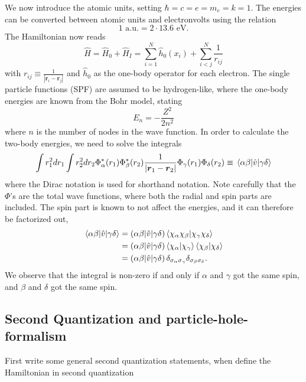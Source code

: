 We now introduce the atomic units, setting $\hbar=c=e=m_e=k=1$. 
The energies can be converted between atomic units and electronvolts using the relation
\begin{equation}
1 \text{ a.u.} = 2\cdot13.6 \text{ eV}.
\end{equation}
The Hamiltonian now reads
\begin{equation}
\hat{H}=\hat{H}_0 + \hat{H}_I=\sum_{i=1}^N\hat{h}_0(x_i)+\sum_{i<j}^N\frac{1}{r_{ij}}
\end{equation}
with $r_{ij}\equiv\frac{1}{|\boldsymbol{r}_i-\boldsymbol{r}_j|}$ and $\hat{h}_0$ as the one-body operator for each electron. The single particle functions (SPF) are assumed to be hydrogen-like, where the one-body energies are known from the Bohr model, stating
\begin{equation}
E_n=-\frac{Z^2}{2n^2}
\end{equation}
where $n$ is the number of nodes in the wave function. In order to calculate the two-body energies, we need to solve the integrals 
\begin{equation}
\int r_1^2dr_1\int r_2^2dr_2 \Phi_{\alpha}^*(r_1)\Phi_{\beta}^*(r_2)\frac{1}{|\boldsymbol{r}_1-\boldsymbol{r}_2|}\Phi_{\gamma}(r_1)\Phi_{\delta}(r_2)\equiv\mel{\alpha\beta}{\hat{v}}{\gamma\delta}
\end{equation}
where the Dirac notation is used for shorthand notation. Note carefully that the $\Phi$'s are the total wave functions, where both the radial and spin parts are included. The spin part is known to not affect the energies, and it can therefore be factorized out,
\begin{align}
\mel{\alpha\beta}{\hat{v}}{\gamma\delta}&=(\alpha\beta|\hat{v}|\gamma\delta)\braket{\chi_{\alpha}\chi_{\beta}}{\chi_{\gamma}\chi_{\delta}}\notag\\
&=(\alpha\beta|\hat{v}|\gamma\delta)\braket{\chi_{\alpha}}{\chi_{\gamma}}\braket{\chi_{\beta}}{\chi_{\delta}}\\
&=(\alpha\beta|\hat{v}|\gamma\delta)\,\delta_{\sigma_{\alpha}\sigma_{\gamma}}\delta_{\sigma_{\beta}\sigma_{\delta}}.\notag
\end{align}
We observe that the integral is non-zero if and only if $\alpha$ and $\gamma$ got the same spin, and $\beta$ and $\delta$ got the same spin.

\subsection{Second Quantization and particle-hole-formalism}
First write some general second quantization statements, when define the Hamiltonian in second quantization

